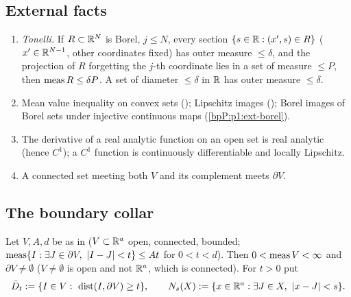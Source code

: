\subsection{External facts}\label{bpP:p4:ext}
\begin{enumerate}[label=(X\arabic*)]
\item\label{bpP:p4:ext-tonelli} \emph{Tonelli.} If $R\subset\mathbb{R}^N$ is Borel, $j\le N$, every section $\{s\in\mathbb{R}:(x',s)\in R\}$ ($x'\in\mathbb{R}^{N-1}$, other coordinates fixed) has outer measure $\le\delta$, and the projection of $R$ forgetting the $j$-th coordinate lies in a set of measure $\le P$, then $\operatorname{meas} R\le\delta P$. A set of diameter $\le\delta$ in $\mathbb{R}$ has outer measure $\le\delta$.
\item\label{bpP:p4:ext-mvt} Mean value inequality on convex sets (); Lipschitz images (); Borel images of Borel sets under injective continuous maps (\ref{bpP:p1:ext-borel}).
\item\label{bpP:p4:ext-deriv} The derivative of a real analytic function on an open set is real analytic (hence $C^1$); a $C^1$ function is continuously differentiable and locally Lipschitz.
\item\label{bpP:p4:ext-conn} A connected set meeting both $V$ and its complement meets $\partial V$.
\end{enumerate}

\subsection{The boundary collar}\label{bpP:p4:s-collar}

Let $V,A,d$ be as in  ($V\subset\mathbb{R}^a$ open, connected, bounded; $\operatorname{meas}\{I:\exists J\in\partial V,\ \abs{I-J}<t\}\le At$ for $0<t<d$). Then $0<\operatorname{meas} V<\infty$ and $\partial V\ne\emptyset$ ($V\ne\emptyset$ is open and not $\mathbb{R}^a$, which is connected). For $t>0$ put
\[\bar D_t:=\{I\in V:\ \operatorname{dist}(I,\partial V)\ge t\},\qquad N_s(X):=\{x\in\R^a:\exists J\in X,\ \abs{x-J}<s\}.\]

